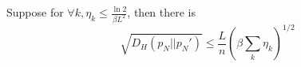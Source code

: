 \documentclass[final,12pt]{colt2018} %
\begin{document}

\begin{lemma}
  \label{Hellinger - improved}
   Suppose for $\forall k, \eta_k \leqslant \frac{\ln 2}{\beta L^2}$, then there is
  \begin{equation}
  \sqrt{D_H(p_N||p_N')}\le  \frac{L}{n}\left(\beta\sum\limits_k \eta_k\right)^{1/2}
  \end{equation}
\end{lemma}
\end{document}
